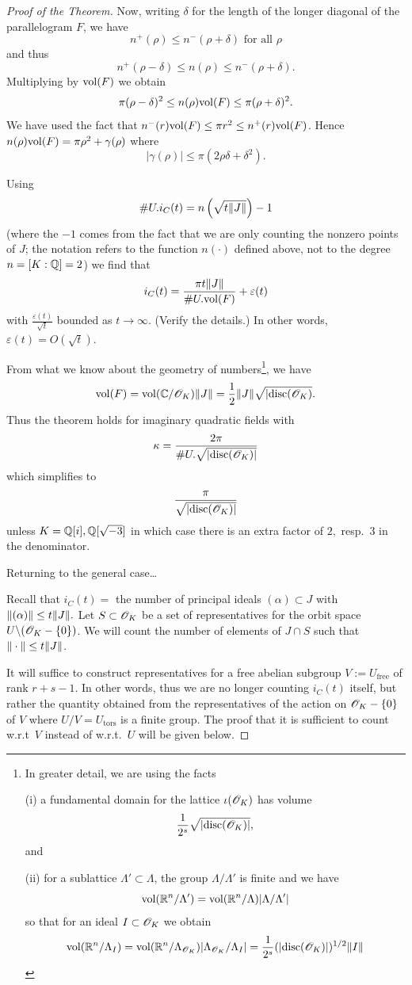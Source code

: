 \documentclass[10pt,a4paper,reqno]{amsart}
\begin{document}
\begin{proof}[Proof of the Theorem]
Now, writing $\delta$ for the length of the longer diagonal of the
parallelogram $F$, we have \[n^+(\rho) \le n^-(\rho+\delta) \text{ for all }
\rho\] and thus \[n^+(\rho-\delta) \le n(\rho) \le n^-(\rho+\delta).\]
Multiplying by $\mathrm{vol}(F)$ we obtain \[\pi(\rho-\delta)^2 \le n(\rho) \mathrm{vol}(F) \le
\pi(\rho+\delta)^2.\] We have used the fact that $n^-(r)\mathrm{vol}(F) \le \pi r^2 \le
n^+(r)\mathrm{vol}(F)$. Hence $n(\rho) \mathrm{vol}(F) = \pi \rho^2 + \gamma(\rho)$ where
\[|\gamma(\rho)| \le \pi (2\rho\delta+\delta^2).\]

Using \[\#U . i_C(t) = n\left( \sqrt{t\| J\|} \right) -1 \] (where the $-1$
comes from the fact that we are only counting the nonzero points of $J$; the
notation refers to the function $n(\cdot)$ defined above, not to the degree
$n=[K:\mathbb{Q}] =2$) we find that \[i_C(t) = \frac{\pi t\| J\|}{\#U . \mathrm{vol}(F)} +
\varepsilon(t)\] with $\frac{\varepsilon(t)}{\sqrt{t}}$ bounded as
$t\rightarrow \infty$. (Verify the details.) In other words, $\varepsilon(t) =
O(\sqrt{t})$.

From what we know about the geometry of numbers\footnote{In greater detail, we
are using the facts

(i) a fundamental domain for the lattice $\iota(\mathscr{O}_K)$ has volume
\[\frac{1}{2^s}\sqrt{|\mathrm{disc}(\mathscr{O}_K)|},\] and

(ii) for a sublattice $\Lambda' \subset \Lambda$, the group $\Lambda/\Lambda'$
is finite and we have \[\mathrm{vol}(\mathbb{R}^n/\Lambda') =
\mathrm{vol}(\mathbb{R}^n/\Lambda)|\Lambda/\Lambda'|\] so that for an ideal $I \subset \mathscr{O}_K$ we
obtain \[\mathrm{vol}(\mathbb{R}^n/\Lambda_I) =
\mathrm{vol}(\mathbb{R}^n/\Lambda_{\mathscr{O}_K})|\Lambda_{\mathscr{O}_K}/\Lambda_I| =
\frac{1}{2^s}(|\mathrm{disc}(\mathscr{O}_K)|)^{1/2}\| I\|\]}, we have \[\mathrm{vol}(F) =
\mathrm{vol}(\mathbb{C}/\mathscr{O}_K)\| J\| = \frac{1}{2} \| J\| \sqrt{|\mathrm{disc}(\mathscr{O}_K)}.\] Thus the
theorem holds for imaginary quadratic fields with \[\kappa = \frac{2\pi}{ \#U .
\sqrt{|\mathrm{disc}(\mathscr{O}_K)|}}\] which simplifies to \[\frac{\pi}{\sqrt{|\mathrm{disc}(\mathscr{O}_K)|}}\]
unless $K = \mathbb{Q}[i],\mathbb{Q}[\sqrt{-3}]$ in which case there is an extra factor of $2,$
resp.~$3$ in the denominator.

Returning to the general case\ldots

Recall that $i_C(t) = $ the number of principal ideals $(\alpha) \subset J$
with $\| (\alpha)\| \le t\| J\|. $ Let $S \subset \mathscr{O}_K$ be a set of
representatives for the orbit space $U\backslash (\mathscr{O}_K - \{0\})$. We will count
the number of elements of $J\cap S$ such that $\| \cdot\| \le t \| J\|$.

It will suffice to construct representatives for a free abelian subgroup $V :=
U_{\text{free}}$ of rank $r+s-1$. In other words, thus we are no longer
counting $i_C(t)$ itself, but rather the quantity obtained from the
representatives of the action on $\mathscr{O}_K - \{0\}$ of $V$ where $U/V =
U_{\text{tors}}$ is a finite group. The proof that it is sufficient to count
w.r.t~$V$ instead of w.r.t.~$U$ will be given below.


\end{proof}
\end{document}
